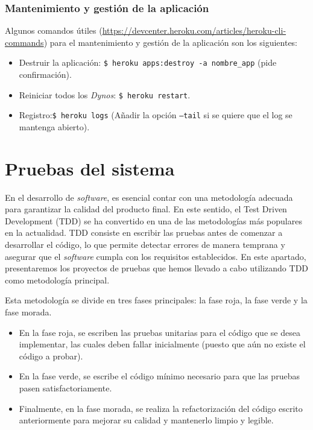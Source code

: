 \subsubsection{Mantenimiento y gestión de la aplicación}
Algunos comandos útiles (\url{https://devcenter.heroku.com/articles/heroku-cli-commands}) para el mantenimiento y gestión de la aplicación son los siguientes:

\begin{itemize}
    \item Destruir la aplicación: \texttt{\$ heroku apps:destroy -a nombre\_app} (pide confirmación).
    
    \item Reiniciar todos los \textit{Dynos}: \texttt{\$ heroku restart}.
    
    \item Registro:\texttt{\$ heroku logs} (Añadir la opción \texttt{--tail} si se quiere que el log se mantenga abierto).
\end{itemize}



\section{Pruebas del sistema}

En el desarrollo de \textit{software}, es esencial contar con una metodología adecuada para garantizar la calidad del producto final. En este sentido, el Test Driven Development (TDD) se ha convertido en una de las metodologías más populares en la actualidad. TDD consiste en escribir las pruebas antes de comenzar a desarrollar el código, lo que permite detectar errores de manera temprana y asegurar que el \textit{software} cumpla con los requisitos establecidos. En este apartado, presentaremos los proyectos de pruebas que hemos llevado a cabo utilizando TDD como metodología principal.

Esta metodología se divide en tres fases principales: la fase roja, la fase verde y la fase morada. 
\begin{itemize}
    \item En la fase roja, se escriben las pruebas unitarias para el código que se desea implementar, las cuales deben fallar inicialmente (puesto que aún no existe el código a probar). 
    \item En la fase verde, se escribe el código mínimo necesario para que las pruebas pasen satisfactoriamente.
    \item Finalmente, en la fase morada, se realiza la refactorización del código escrito anteriormente para mejorar su calidad y mantenerlo limpio y legible.
\end{itemize}

